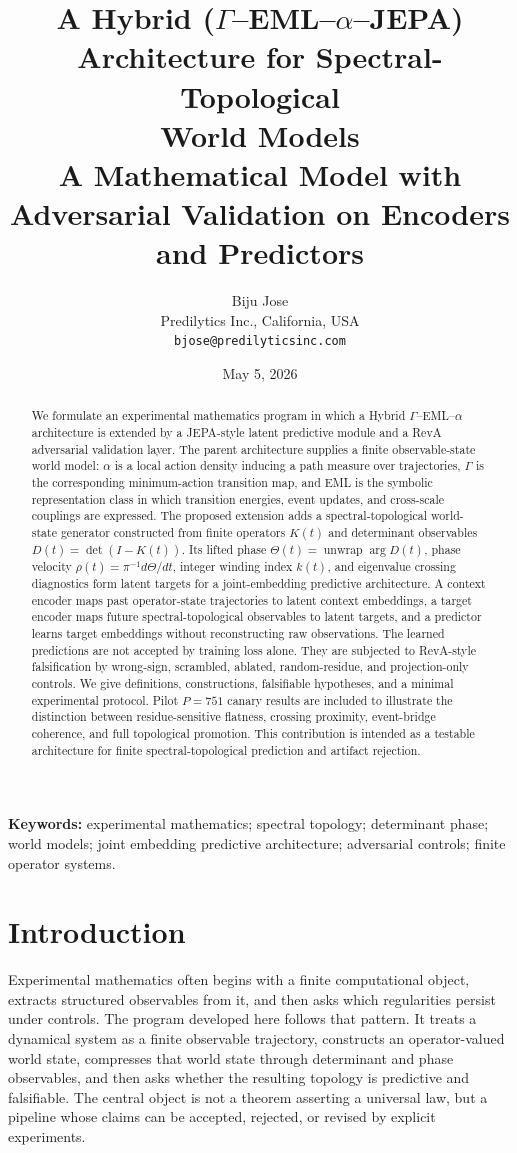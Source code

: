 \documentclass[11pt]{article}
\title{A Hybrid ($\Gamma$--EML--$\alpha$--JEPA) Architecture for Spectral-Topological\\
World Models\\
\large A Mathematical Model with Adversarial Validation on Encoders and  Predictors}
\author{Biju Jose\\
Predilytics Inc., California, USA\\
\texttt{bjose@predilyticsinc.com}}
\date{May 5, 2026}
\begin{document}
\maketitle

\begin{abstract}
We formulate an experimental mathematics program in which a Hybrid $\Gamma$--EML--$\alpha$ architecture is extended by a JEPA-style latent predictive module and a RevA adversarial validation layer. The parent architecture supplies a finite observable-state world model: $\alpha$ is a local action density inducing a path measure over trajectories, $\Gamma$ is the corresponding minimum-action transition map, and EML is the symbolic representation class in which transition energies, event updates, and cross-scale couplings are expressed. The proposed extension adds a spectral-topological world-state generator constructed from finite operators $K(t)$ and determinant observables $D(t)=\det(I-K(t))$. Its lifted phase $\Theta(t)=\operatorname{unwrap}\arg D(t)$, phase velocity $\rho(t)=\pi^{-1}d\Theta/dt$, integer winding index $k(t)$, and eigenvalue crossing diagnostics form latent targets for a joint-embedding predictive architecture. A context encoder maps past operator-state trajectories to latent context embeddings, a target encoder maps future spectral-topological observables to latent targets, and a predictor learns target embeddings without reconstructing raw observations. The learned predictions are not accepted by training loss alone. They are subjected to RevA-style falsification by wrong-sign, scrambled, ablated, random-residue, and projection-only controls. We give definitions, constructions, falsifiable hypotheses, and a minimal experimental protocol. Pilot $P=751$ canary results are included to illustrate the distinction between residue-sensitive flatness, crossing proximity, event-bridge coherence, and full topological promotion. This contribution is intended as a testable architecture for finite spectral-topological prediction and artifact rejection.
\end{abstract}

\noindent\textbf{Keywords:} experimental mathematics; spectral topology; determinant phase; world models; joint embedding predictive architecture; adversarial controls; finite operator systems.

\section{Introduction}
Experimental mathematics often begins with a finite computational object, extracts structured observables from it, and then asks which regularities persist under controls. The program developed here follows that pattern. It treats a dynamical system as a finite observable trajectory, constructs an operator-valued world state, compresses that world state through determinant and phase observables, and then asks whether the resulting topology is predictive and falsifiable. The central object is not a theorem asserting a universal law, but a pipeline whose claims can be accepted, rejected, or revised by explicit experiments.
\end{document}
